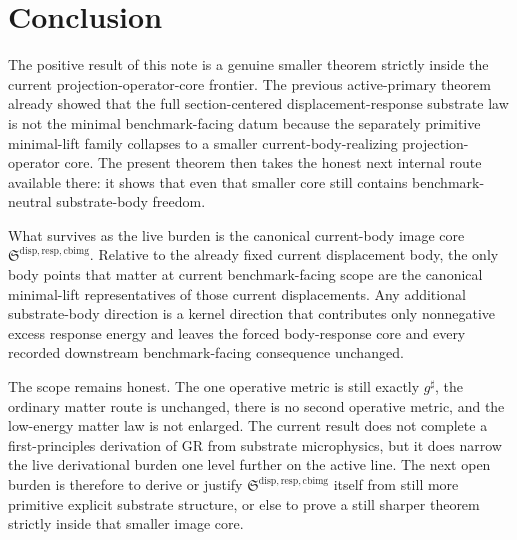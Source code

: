 \documentclass[11pt]{article}
\newcommand{\CompletedMetric}{g^{\sharp}}
\newcommand{\CurrentBodyImageCore}{\mathfrak S^{\mathrm{disp,resp,cbimg}}}
\begin{document}
\section{Conclusion}

The positive result of this note is a genuine smaller theorem strictly inside the current projection-operator-core frontier. The previous active-primary theorem already showed that the full section-centered displacement-response substrate law is not the minimal benchmark-facing datum because the separately primitive minimal-lift family collapses to a smaller current-body-realizing projection-operator core. The present theorem then takes the honest next internal route available there: it shows that even that smaller core still contains benchmark-neutral substrate-body freedom.

What survives as the live burden is the canonical current-body image core \(\CurrentBodyImageCore\). Relative to the already fixed current displacement body, the only body points that matter at current benchmark-facing scope are the canonical minimal-lift representatives of those current displacements. Any additional substrate-body direction is a kernel direction that contributes only nonnegative excess response energy and leaves the forced body-response core and every recorded downstream benchmark-facing consequence unchanged.

The scope remains honest. The one operative metric is still exactly \(\CompletedMetric\), the ordinary matter route is unchanged, there is no second operative metric, and the low-energy matter law is not enlarged. The current result does not complete a first-principles derivation of GR from substrate microphysics, but it does narrow the live derivational burden one level further on the active line. The next open burden is therefore to derive or justify \(\CurrentBodyImageCore\) itself from still more primitive explicit substrate structure, or else to prove a still sharper theorem strictly inside that smaller image core.
\end{document}
